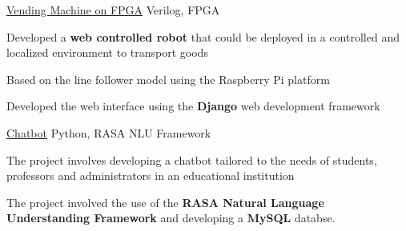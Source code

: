 \begin{cventries}
    \projects
    {} %
     {\href{}{Vending Machine on FPGA}} %
     {Verilog, FPGA} %
     {} %
     {
       \begin{cvitems} %
         \item {Developed a \textbf{web controlled robot} that could be deployed in a controlled and localized environment to transport goods}
         \item {Based on the line follower model using the Raspberry Pi platform}
         \item {Developed the web interface using the \textbf{Django} web development framework}
       \end{cvitems}
     }

  \projects
    {} %
    {\href{https://github.com/software-community/almost-human}{Chatbot}} %
    {Python, RASA NLU Framework} %
    {} %
    {
      \begin{cvitems} %
        \item {The project involves developing a chatbot tailored to the needs of students, professors and administrators in an educational institution}
        \item {The project involved the use of the \textbf{RASA Natural Language Understanding Framework} and developing a \textbf{MySQL} databse.}
      \end{cvitems}
    }

 


  


 


\end{cventries}
